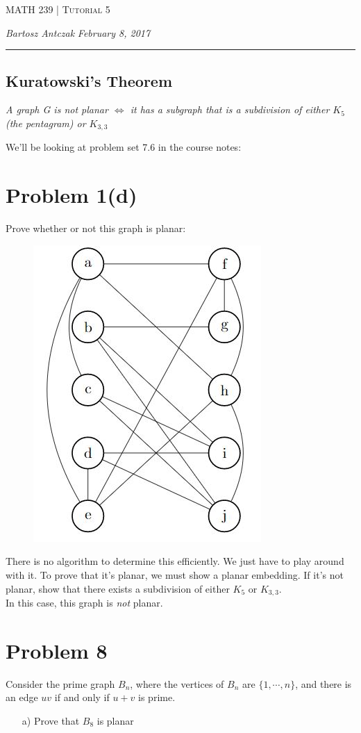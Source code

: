 \documentclass{report}
\newcommand{\lectureNum}{5}
\newcommand{\curDate}{February 8, 2017}
\newcommand{\course}{MATH 239}
\begin{document}
\begin{center}
\begin{Large}
\textsc{\course{} | Tutorial \lectureNum{}}
\end{Large}
\end{center} 
\noindent \textit{Bartosz Antczak} \hfill
\textit{\curDate{}}
\rule{\textwidth}{0.4pt}
\subsection*{Kuratowski's Theorem}
\begin{center}
\textit{A graph G is not planar $\iff$ it has a subgraph that is a subdivision of either $K_5$ (the pentagram) or $K_{3,3}$}
\end{center}
We'll be looking at problem set 7.6 in the course notes:
\section*{Problem 1(d)}
Prove whether or not this graph is planar:
\begin{figure}[ht]
\begin{center}
\includegraphics[scale=0.7]{graph1.jpg}
\end{center}
\end{figure}
There is no algorithm to determine this efficiently. We just have to play around with it. To prove that it's planar, we must show a planar embedding. If it's not planar, show that there exists a subdivision of either $K_5$ or $K_{3,3}$.\\In this case, this graph is \textit{not} planar.
\section*{Problem 8}
Consider the prime graph $B_n$, where the vertices of $B_n$ are $\{1, \cdots, n\}$, and there is an edge $uv$ if and only if $u+v$ is prime.
\begin{enumerate}
\item[a)] Prove that $B_8$ is planar\\
\end{enumerate}
\end{document}

